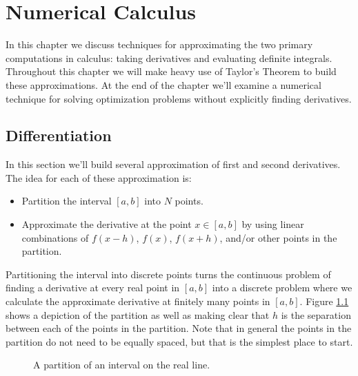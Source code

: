 \chapter{Numerical Calculus}
In this chapter we discuss techniques for approximating the two primary computations
in calculus: taking derivatives and evaluating definite integrals. Throughout this chapter
we will make heavy use of Taylor's Theorem to build these approximations. At the end of
the chapter we'll examine a numerical technique for solving optimization problems without
explicitly finding derivatives. 

\section{Differentiation}
In this section we'll build several approximation of first and second derivatives.  The
idea for each of these approximation is:
\begin{itemize}
    \item Partition the interval $[a,b]$ into $N$ points.
    \item Approximate the derivative at the point $x \in [a,b]$ by using linear
        combinations of $f(x-h)$, $f(x)$, $f(x+h)$, and/or other points in the partition.  
\end{itemize}
Partitioning the interval into discrete points turns the continuous problem of finding a
derivative at every real point in $[a,b]$ into a discrete
problem where we calculate the approximate derivative at finitely many points in $[a,b]$.
Figure \ref{fig:differentiation_partition} shows a depiction of the partition as well as
making clear that $h$ is the separation between each of the points in the partition.  Note
that in general the points in the partition do not need to be equally spaced, but that is
the simplest place to start.
\begin{figure}[ht!]
    \begin{center}
    \end{center}
    \caption{A partition of an interval on the real line.}
    \label{fig:differentiation_partition}
\end{figure}

